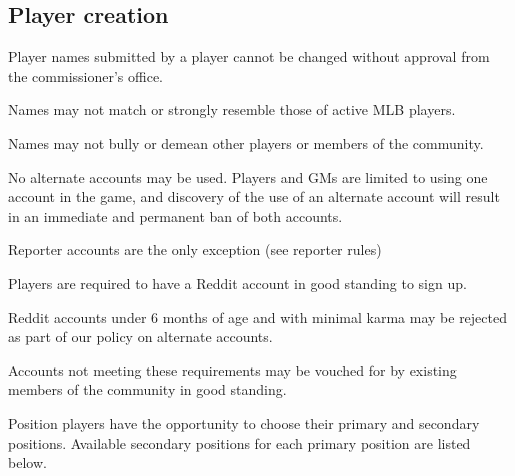 \subsection{Player creation}
\begin{deepEnumerate}
	\item Player names submitted by a player cannot be changed
	without approval from the commissioner’s office.
	\begin{deepEnumerate}
		\item Names may not match or strongly resemble those of active MLB players.
		\item Names may not bully or demean other players or members of the community.
		\item No alternate accounts may be used.
		Players and GMs are limited to using one account in the game,
		and discovery of the use of an alternate account
		will result in an immediate and permanent ban of both accounts.
		\begin{deepEnumerate}
			\item Reporter accounts are the only exception (see reporter rules) %
		\end{deepEnumerate}
	\end{deepEnumerate}
	\item Players are required to have a Reddit account in good standing to sign up.
	\begin{deepEnumerate}
		\item Reddit accounts under 6 months of age and with minimal karma
		may be rejected as part of our policy on alternate accounts.
		\begin{deepEnumerate}
			\item Accounts not meeting these requirements may be vouched for
			by existing members of the community in good standing.
		\end{deepEnumerate}
	\end{deepEnumerate}
	\item Position players have the opportunity to choose their primary and secondary positions.
	Available secondary positions for each primary position are listed below.
	

\end{deepEnumerate}
